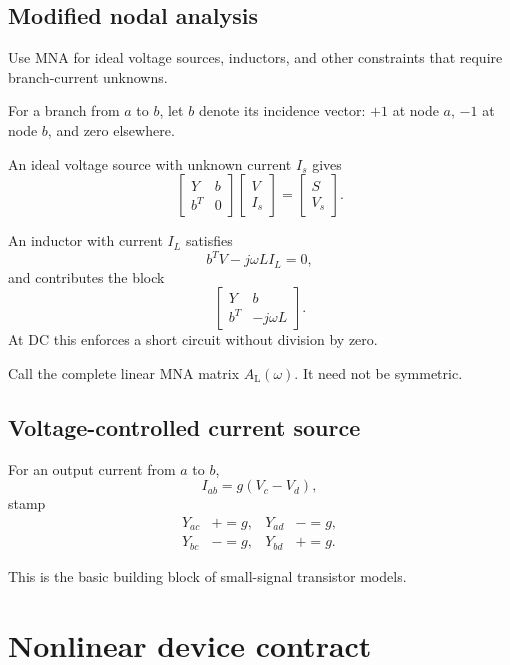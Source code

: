 \documentclass[11pt,a4paper]{article}
\begin{document}
\subsection{Modified nodal analysis}

Use MNA for ideal voltage sources, inductors, and other constraints
that require branch-current unknowns.

For a branch from $a$ to $b$, let $b$ denote its incidence vector:
$+1$ at node $a$, $-1$ at node $b$, and zero elsewhere.

An ideal voltage source with unknown current $I_s$ gives
\[
\begin{bmatrix}
Y & b\\
b^T & 0
\end{bmatrix}
\begin{bmatrix}
V\\ I_s
\end{bmatrix}
=
\begin{bmatrix}
S\\ V_s
\end{bmatrix}.
\]

An inductor with current $I_L$ satisfies
\[
 b^T V-j\omega L I_L=0,
\]
and contributes the block
\[
\begin{bmatrix}
Y & b\\
b^T & -j\omega L
\end{bmatrix}.
\]
At DC this enforces a short circuit without division by zero.

Call the complete linear MNA matrix $A_{\mathrm L}(\omega)$.
It need not be symmetric.

\subsection{Voltage-controlled current source}

For an output current from $a$ to $b$,
\[
 I_{ab}=g(V_c-V_d),
\]
stamp
\[
\begin{aligned}
Y_{ac}&\mathrel{+}=g,&Y_{ad}&\mathrel{-}=g,\\
Y_{bc}&\mathrel{-}=g,&Y_{bd}&\mathrel{+}=g.
\end{aligned}
\]

This is the basic building block of small-signal transistor models.

\section{Nonlinear device contract}
\end{document}
